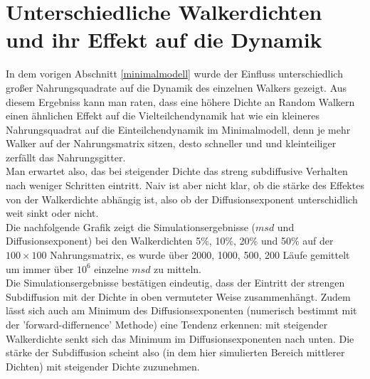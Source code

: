 \documentclass[a4paper, 12pt]{report}
\begin{document}
\section{Unterschiedliche Walkerdichten und ihr Effekt auf die Dynamik}
In dem vorigen Abschnitt \ref{minimalmodell} wurde der Einfluss unterschiedlich großer Nahrungsquadrate auf die Dynamik des einzelnen Walkers gezeigt. Aus diesem Ergebniss kann man raten, dass eine höhere Dichte an Random Walkern einen ähnlichen Effekt auf die Vielteilchendynamik hat wie ein kleineres Nahrungsquadrat auf die Einteilchendynamik im Minimalmodell, denn je mehr Walker auf der Nahrungsmatrix sitzen, desto schneller und und kleinteiliger zerfällt das Nahrungsgitter. 
\\
Man erwartet also, das bei steigender Dichte das streng subdiffusive Verhalten nach weniger Schritten eintritt. Naiv ist aber nicht klar, ob die stärke des Effektes von der Walkerdichte abhängig ist, also ob der Diffusionsexponent unterschidlich weit sinkt oder nicht.
\\
\noindent
Die nachfolgende Grafik zeigt die Simulationsergebnisse ($msd$ und Diffusionsexponent) bei den Walkerdichten 5\%, 10\%, 20\% und 50\% auf der $100 \times 100$ Nahrungsmatrix, es wurde über 2000, 1000, 500, 200 Läufe gemittelt um immer über $10^6$ einzelne $msd$ zu mitteln.
\\
\noindent Die Simulationsergebnisse bestätigen eindeutig, dass der Eintritt der strengen Subdiffusion mit der Dichte in oben vermuteter Weise zusammenhängt. Zudem lässt sich auch am Minimum des Diffusionsexponenten (numerisch bestimmt mit der 'forward-differnence' Methode) eine Tendenz erkennen: mit steigender Walkerdichte senkt sich das Minimum im Diffusionsexponenten nach unten. Die stärke der Subdiffusion scheint also (in dem hier simulierten Bereich mittlerer Dichten) mit steigender Dichte zuzunehmen.
\end{document}
